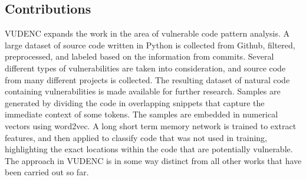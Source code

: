 \documentclass[
a4paper,
pagesize,
pdftex,
12pt,
twoside, %
BCOR=5mm, %
ngerman,
fleqn,
final,
]{scrartcl}
\begin{document}
	
	\subsection{Contributions}
	
	VUDENC expands the work in the area of vulnerable code pattern analysis. A large dataset of source code written in Python is collected from Github, filtered, preprocessed, and labeled based on the information from commits. Several different types of vulnerabilities are taken into consideration, and source code from many different projects is collected. The resulting dataset of natural code containing vulnerabilities is made available for further research. Samples are generated by dividing the code in overlapping snippets that capture the immediate context of some tokens. The samples are embedded in numerical vectors using word2vec. A long short term memory network is trained to extract features, and then applied to classify code that was not used in training, highlighting the exact locations within the code that are potentially vulnerable. The approach in VUDENC is in some way distinct from all other works that have been carried out so far.\\
	
\end{document}
